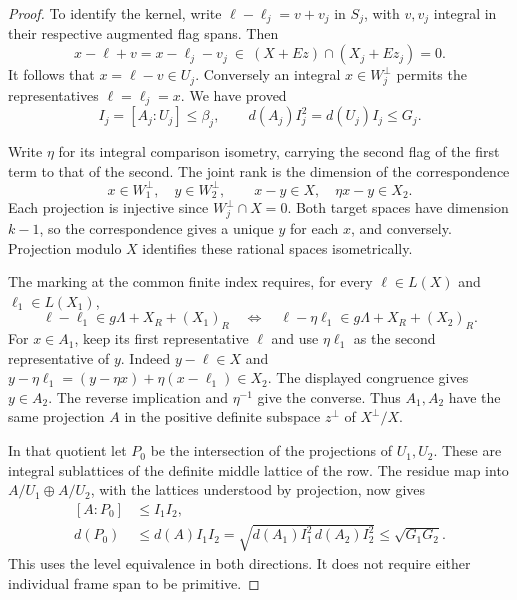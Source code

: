 \begin{proof}
To identify the kernel, write \(\ell-\ell_j=v+v_j\) in \(S_j\),
with \(v,v_j\) integral in their respective augmented flag spans.
Then
\[
       x-\ell+v=x-\ell_j-v_j
        \ \in\ (X+Ez)\cap(X_j+Ez_j)=0 .
\]
It follows that \(x=\ell-v\in U_j\). Conversely an integral
\(x\in W_j^\perp\) permits the representatives \(\ell=\ell_j=x\).
We have proved
\begin{equation}\label{eq:nonprimitive-one-index}
 I_j=[A_j:U_j]\le\beta_j,\qquad
 d(A_j)I_j^2=d(U_j)I_j\le G_j .
\end{equation}

Write \(\eta\) for its integral comparison isometry, carrying the
second flag of the first term to that of the second. The joint
rank is the dimension of the correspondence
\[
 x\in W_1^\perp,\quad y\in W_2^\perp,\qquad
 x-y\in X,\quad \eta x-y\in X_2 .
\]
Each projection is injective since \(W_j^\perp\cap X=0\).
Both target spaces have dimension \(k-1\), so the correspondence
gives a unique \(y\) for each \(x\), and conversely. Projection
modulo \(X\) identifies these rational spaces isometrically.

The marking at the common finite index requires, for every
\(\ell\in L(X)\) and \(\ell_1\in L(X_1)\),
\[
 \ell-\ell_1\in g\Lambda+X_R+(X_1)_R
 \quad\Longleftrightarrow\quad
 \ell-\eta\ell_1\in g\Lambda+X_R+(X_2)_R .
\]
For \(x\in A_1\), keep its first representative \(\ell\) and
use \(\eta\ell_1\) as the second representative of \(y\).
Indeed \(y-\ell\in X\) and
\(y-\eta\ell_1=(y-\eta x)+\eta(x-\ell_1)\in X_2\).
The displayed congruence gives \(y\in A_2\).
The reverse implication and \(\eta^{-1}\) give the converse.
Thus \(A_1,A_2\) have the same projection \(A\) in the
positive definite subspace \(z^\perp\) of \(X^\perp/X\).

In that quotient let \(P_0\) be the intersection of the
projections of \(U_1,U_2\). These are integral sublattices of
the definite middle lattice of the row. The residue map into
\(A/U_1\oplus A/U_2\), with the lattices understood by projection,
now gives
\[
 \begin{aligned}
  {}[A:P_0]&\le I_1I_2,\\
  d(P_0)&\le d(A)I_1I_2
      =\sqrt{d(A_1)I_1^2\,d(A_2)I_2^2}
      \le \sqrt{G_1G_2}.
 \end{aligned}
\]
This uses the level equivalence in both directions. It does not
require either individual frame span to be primitive.


\end{proof}
